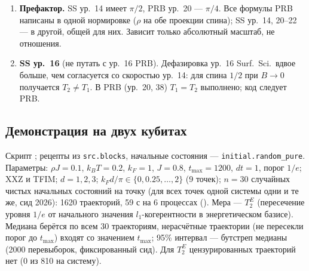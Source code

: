 \documentclass[12pt,a4paper]{article}
\newcommand{\rhoJ}{\rho J}
\newcommand{\kT}{k_BT}
\begin{document}
\begin{enumerate}[label=(\roman*)]
квадратичной анизотропии и спина (проверено для $S=1,\tfrac32,2,\tfrac52$). Ур.~24 печатает $3/2$
(множитель 2); ур.~23 печатает $\Lambda/8$ с $\Lambda=\tfrac32(1+E^2/D^2)$, то есть $3/16$ при $E=0$
(множитель 4); численно $\Lambda=3/2$ при $E=0$ и $E=2$ мэВ. Отклонение напечатанных формул от ур.~21 при $\rhoJ\le0.3$:
0.59 (ур.~24), 0.44 и 0.40 (ур.~23, $E=0$ и $2$ мэВ). Для $W=1$ эВ, $\kT=0.1$ мэВ и уменьшения щели
вдвое (примерно с 10 до 5 мэВ, как в эксперименте с Co на Cu$_2$N) нужно $\rhoJ=0.28$ по общей
формуле и $0.55$ по ур.~23; отношение 2 --- ровно разница соглашений о плотности состояний.
Ур.~23 взято из работы Oberg et al., Nat.\ Nanotechnol.\ 9, 64 (2014), ур.~(2); множитель 4 ---
ровно смена соглашения о плотности состояний (на одну или на обе проекции спина), то есть
коэффициент, вероятно, сохранил нормировку той работы. Множитель 2 в ур.~24 соглашениями
не объясняется. Отношение «анизотропия : поле» $=3$ от нормировки не зависит и нарушено в
обоих случаях.
\item \textbf{Префактор.} SS ур.~14 имеет $\pi/2$, PRB ур.~20 --- $\pi/4$. Все формулы PRB написаны в
одной нормировке ($\rho$ на обе проекции спина); SS ур.~14, 20--22 --- в другой, общей для них.
Зависит только абсолютный масштаб, не отношения.
\item \textbf{SS ур.~16} (не путать с ур.~16 PRB). Дефазировка ур.~16 Surf.\ Sci.\ вдвое больше, чем согласуется со скоростью ур.~14:
для спина $1/2$ при $B\to0$ получается $T_2\ne T_1$. В PRB (ур.~20, 38) $T_1=T_2$ выполнено; код
следует PRB.
\end{enumerate}

\subsection{Демонстрация на двух кубитах}\label{sec:demo}

Скрипт ; рецепты из \texttt{src.blocks}, начальные состояния ---
\texttt{initial.random\_pure}. Параметры: $\rhoJ=0.1$, $\kT=0.2$, $k_F=1$, $J=0.8$, $t_{\max}=1200$,
$dt=1$, порог $1/e$; XXZ и TFIM; $d=1,2,3$; $k_Fd/\pi\in\{0,0.25,\dots,2\}$ (9 точек); $n=30$ случайных
чистых начальных состояний на точку (для всех точек одной системы одни и те же, сид 2026): 1620 траекторий,
59 с на 6 процессах (). Мера --- $T_2^E$ (пересечение уровня $1/e$ от начального
значения $l_1$-когерентности в энергетическом базисе). Медиана берётся по всем 30 траекториям, нерасчётные
траектории (не пересекли порог до $t_{\max}$) входят со значением $t_{\max}$; 95\% интервал --- бутстреп
медианы (2000 перевыборок, фиксированный сид). Для $T_2^E$ цензурированных траекторий нет (0 из 810 на
систему).
\end{document}
